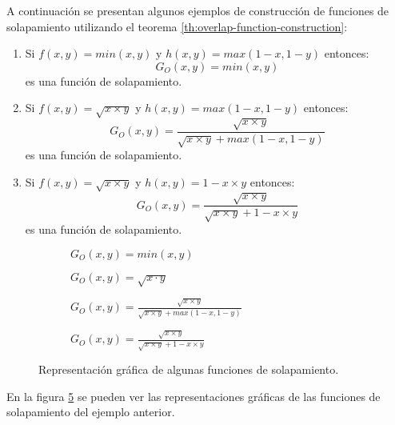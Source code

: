 \begin{example}
A continuación se presentan algunos ejemplos de construcción de funciones de solapamiento utilizando el teorema  \ref{th:overlap-function-construction}:
\begin{enumerate}[label=(\arabic*),ref=(\arabic*)]
	\item Si $f(x,y)=min(x,y)$ y $h(x,y) = max(1-x,1-y)$ entonces: 
	\begin{equation}
	G_{O}(x,y) = min(x,y)
	\end{equation} es una función de solapamiento.
	\item Si $f(x,y)=\sqrt{x \times y}$ y $h(x,y) = max(1-x,1-y)$ entonces: 
	\begin{equation}G_{O}(x,y) = \frac{\sqrt{x \times y}}{\sqrt{x \times y} + max(1-x,1-y)}
	\end{equation} es una función de solapamiento.
	\item Si $f(x,y)=\sqrt{x \times y}$ y $h(x,y) = 1 - x \times y $ entonces: 
	\begin{equation}G_{O}(x,y) = \frac{\sqrt{x \times y}}{\sqrt{x \times y} + 1 - x \times y}
	\end{equation} es una función de solapamiento.
\end{enumerate}
\end{example}
\begin{figure}[t]
	\centering
	\begin{subfigure}[b]{0.45\textwidth}
		\setlength\figureheight{4.5cm}
		\setlength\figurewidth{6cm}
		
		\caption{$G_{O}(x,y) = min(x,y)$}
		\label{fig:overlap-functions-min}
	\end{subfigure}
	\qquad
	\begin{subfigure}[b]{0.45\textwidth}
		\setlength\figureheight{4.5cm}
		\setlength\figurewidth{6cm}
		
		\caption{$G_{O}(x,y) = \sqrt{x \cdot y}$}
		\label{fig:overlap-functions-sqrt}
	\end{subfigure}	
	
	\vspace{1 cm}
	\begin{subfigure}[b]{0.45\textwidth}
		\setlength\figureheight{4.5cm}
		\setlength\figurewidth{6cm}
		
		\caption{$G_{O}(x,y) = \frac{\sqrt{x \times y}}{\sqrt{x \times y} + max(1-x,1-y)}$}
		\label{fig:overlap-functions-sqrt-max}
	\end{subfigure}
	\qquad
	\begin{subfigure}[b]{0.45\textwidth}
		\setlength\figureheight{4.5cm}
		\setlength\figurewidth{6cm}
		
		\caption{$G_{O}(x,y) = \frac{\sqrt{x \times y}}{\sqrt{x \times y} + 1 - x \times y}$}
		\label{fig:overlap-functions-sqrt-2}
	\end{subfigure}
	\caption{Representación gráfica de algunas funciones de solapamiento.}
	\label{fig:overlap-functions-examples}
\end{figure}
En la figura \ref{fig:overlap-functions-examples} se pueden ver las representaciones gráficas de las funciones de solapamiento del ejemplo anterior.

